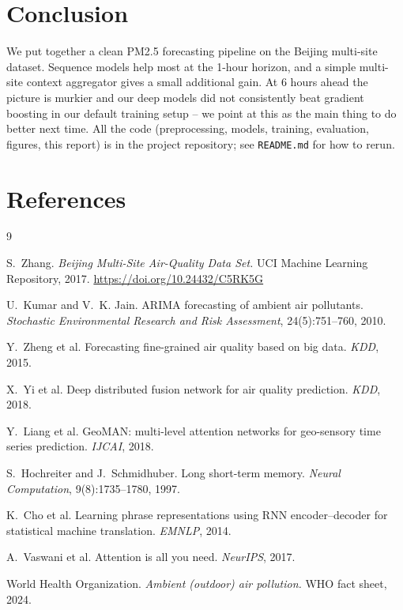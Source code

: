 \documentclass{article}
\begin{document}
\section{Conclusion}

We put together a clean PM2.5 forecasting pipeline on the Beijing
multi-site dataset. Sequence models help most at the 1-hour horizon,
and a simple multi-site context aggregator gives a small additional
gain. At 6 hours ahead the picture is murkier and our deep models did
not consistently beat gradient boosting in our default training setup
-- we point at this as the main thing to do better next time. All the
code (preprocessing, models, training, evaluation, figures, this
report) is in the project repository; see \texttt{README.md} for how to
rerun.

\section*{References}
\small
\setlength{\itemsep}{2pt}
\begin{thebibliography}{9}

S.~Zhang. \emph{Beijing Multi-Site Air-Quality Data Set.} UCI Machine
Learning Repository, 2017. \url{https://doi.org/10.24432/C5RK5G}

U.~Kumar and V.~K. Jain. ARIMA forecasting of ambient air pollutants.
\emph{Stochastic Environmental Research and Risk Assessment},
24(5):751--760, 2010.

Y.~Zheng et al. Forecasting fine-grained air quality based on big
data. \emph{KDD}, 2015.

X.~Yi et al. Deep distributed fusion network for air quality
prediction. \emph{KDD}, 2018.

Y.~Liang et al. GeoMAN: multi-level attention networks for geo-sensory
time series prediction. \emph{IJCAI}, 2018.

S.~Hochreiter and J.~Schmidhuber. Long short-term memory. \emph{Neural
Computation}, 9(8):1735--1780, 1997.

K.~Cho et al. Learning phrase representations using RNN
encoder--decoder for statistical machine translation.
\emph{EMNLP}, 2014.

A.~Vaswani et al. Attention is all you need. \emph{NeurIPS}, 2017.

World Health Organization. \emph{Ambient (outdoor) air pollution.}
WHO fact sheet, 2024.

\end{thebibliography}
\end{document}
